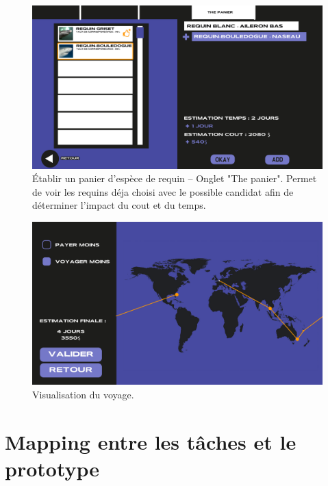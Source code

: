 \documentclass{article}
\begin{document}
\begin{figure}[!h]
	\centering
	\includegraphics[width=14.4cm]{assets/prototype/basse/onglet4}
	\caption{Établir un panier d’espèce de requin – Onglet "The panier". Permet de voir les requins déja choisi avec le possible candidat afin de déterminer l'impact du cout et du temps.}
    \label{onglet4} 
\end{figure}

\begin{figure}[!h]
	\centering
	\includegraphics[width=14.4cm]{assets/prototype/basse/onglet5}
	\caption{Visualisation du voyage.}
    \label{onglet5} 
\end{figure}

\clearpage
\section{Mapping entre les tâches et le prototype}
\end{document}
